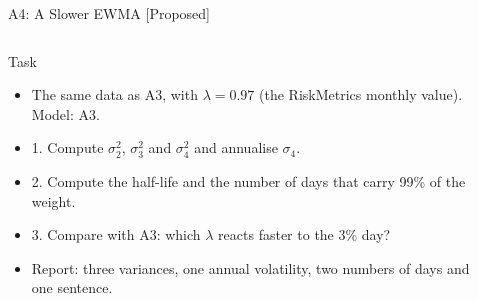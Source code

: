 \begin{frame}{A4: A Slower EWMA [Proposed]}
\propsub
\itemsize{\scriptsize}
\begin{columns}[T]
\begin{column}{\taskw}
\begin{block}{Task}
\begin{itemize}
    \item The same data as A3, with $\lambda = 0.97$ (the RiskMetrics monthly value). Model: A3.
    \item 1. Compute $\sigma_2^2$, $\sigma_3^2$ and $\sigma_4^2$ and annualise $\sigma_4$.
    \item 2. Compute the half-life and the number of days that carry 99\% of the weight.
    \item 3. Compare with A3: which $\lambda$ reacts faster to the 3\% day?
    \item Report: three variances, one annual volatility, two numbers of days and one sentence.
\end{itemize}
\end{block}
\end{column}
\begin{column}{\solw}
\end{column}
\end{columns}
\end{frame}

